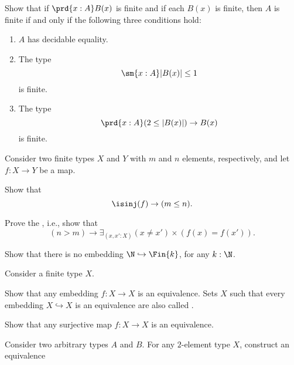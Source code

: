 \begin{exercises}
\begin{subexenum}
\begin{equation*}
    \end{equation*}
  \item Show that if $\prd{x:A}B(x)$ is finite and if each $B(x)$ is finite, then $A$ is finite if and only if the following three conditions hold:
    \begin{enumerate}
    \item $A$ has decidable equality.
    \item The type
      \begin{equation*}
        \sm{x:A}|B(x)|\leq 1
      \end{equation*}
      is finite.
    \item The type
      \begin{equation*}
        \prd{x:A}(2\leq|B(x)|)\to B(x)
      \end{equation*}
      is finite.
    \end{enumerate}
  \end{subexenum}
  \exitem Consider two finite types $X$ and $Y$ with $m$ and $n$ elements, respectively, and let $f:X\to Y$ be a map.
  \begin{subexenum}
  \item Show that
    \begin{equation*}
      \isinj(f)\to (m\leq n).
    \end{equation*}
  \item Prove the , i.e., show that
    \begin{equation*}
      (n>m)\to \exists_{(x,x':X)}(x\neq x')\times(f(x)=f(x')).
    \end{equation*}
  \item Show that there is no embedding $\N\hookrightarrow \Fin{k}$, for any $k:\N$.
  \end{subexenum}
  \exitem Consider a finite type $X$.
  \begin{subexenum}
  \item Show that any embedding $f:X\to X$ is an equivalence. Sets $X$ such that every embedding $X\hookrightarrow X$ is an equivalence are also called .
  \item Show that any surjective map $f:X\to X$ is an equivalence.
  \end{subexenum}
  \exitem Consider two arbitrary types $A$ and $B$. For any $2$-element type $X$, construct an equivalence
  \begin{equation*}

\end{equation*}
\end{exercises}
